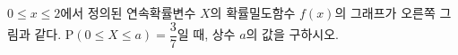 \noindent\begin{minipage}[t]{0.58\linewidth}\vspace{0pt}\raggedright $0\le x\le 2$에서 정의된 연속확률변수 $X$의 확률밀도함수 $f(x)$의 그래프가 오른쪽 그림과 같다. $\mathrm{P}(0\le X\le a)=\dfrac{3}{7}$일 때, 상수 $a$의 값을 구하시오. \end{minipage}\hfill\begin{minipage}[t]{0.4\linewidth}\vspace{0pt}\centering \resizebox{\ifdim\width>\linewidth\linewidth\else\width\fi}{!}{}\end{minipage}\par
